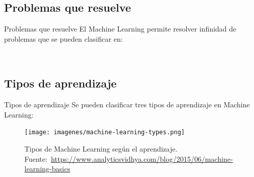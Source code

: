 \documentclass[hyperref={unicode}]{beamer}
\begin{document}
\subsection{Problemas que resuelve}
\begin{frame}{Problemas que resuelve}
El Machine Learning permite resolver infinidad de problemas que se pueden clasificar en:


\begin{figure}
	\centering
	\qquad\qquad
	\\
	\qquad\qquad
\end{figure}

\end{frame}

\subsection{Tipos de aprendizaje}
\begin{frame}{Tipos de aprendizaje}
	Se pueden clasificar tres tipos de aprendizaje en Machine Learning:
	
	\begin{figure}
		\begin{center}
			\texttt{[image: imagenes/machine-learning-types.png]}
			\caption{Tipos de Machine Learning según el aprendizaje. Fuente:~\url{https://www.analyticsvidhya.com/blog/2015/06/machine-learning-basics}}
		\end{center}
	\end{figure}
\end{frame}
\end{document}
